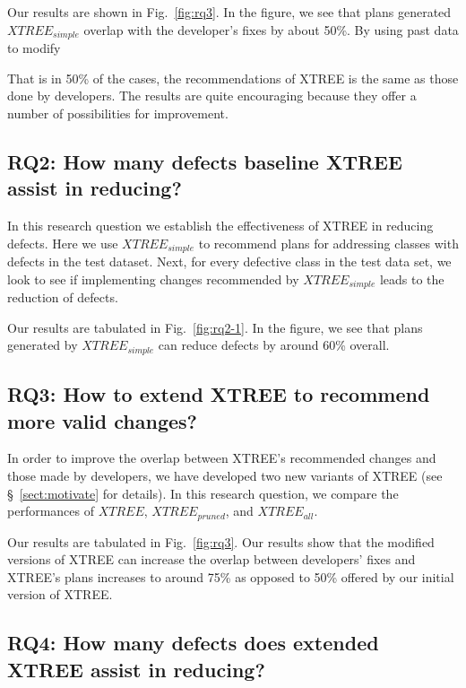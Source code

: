 \documentclass[sigconf, proceedings, 9pt]{acmart}
\newcommand{\tion}[1]{\S~\ref{sect:#1}}
\newcommand{\fig}[1]{Fig.~\ref{fig:#1}}
\begin{document}
Our results are shown in \fig{rq3}. In the figure, we see that plans generated 
$XTREE_{simple}$ overlap with the developer's fixes by about 50\%. By using 
past data to modify

That is in 
50\% of the cases, the recommendations of XTREE is the same as those done by 
developers. The results are quite encouraging because they offer a number of 
possibilities for improvement.

\subsection*{\textbf{RQ2: How many defects baseline XTREE assist in 
reducing?}}
\label{sect:rq2}



In this research question we establish the effectiveness of XTREE in 
reducing defects. Here we use $XTREE_{simple}$ to recommend plans for 
addressing classes with defects in the test dataset. Next, for every defective 
class in the test data set, we look to see if implementing changes recommended 
by $XTREE_{simple}$ leads to the reduction of defects.

Our results are tabulated in \fig{rq2-1}. In the figure, we see that plans 
generated by $XTREE_{simple}$ can reduce defects by around 60\% overall. 

\subsection*{\textbf{RQ3: How to extend XTREE to recommend more valid 
changes?}} 
\label{sect:rq3}


In order to improve the overlap between XTREE's recommended changes and those 
made by developers, we have developed two new variants of XTREE (see 
\tion{motivate} for details). In this research question, we compare the 
performances of $XTREE$, $XTREE_{pruned}$, and $XTREE_{all}$.

Our results are tabulated in \fig{rq3}. Our results show that the modified 
versions of XTREE can increase the overlap between developers' fixes and 
XTREE's plans increases to around 75\% as opposed to 50\% offered by our 
initial version of XTREE.


\subsection*{\textbf{RQ4: How many defects does extended XTREE assist 
in reducing?}} 
\end{document}
